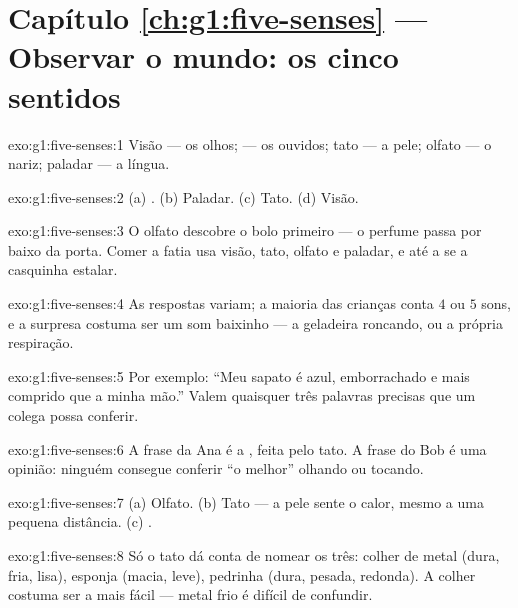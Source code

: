 \section*{Capítulo \ref{ch:g1:five-senses} --- Observar o mundo: os cinco sentidos}

\begin{solution}{exo:g1:five-senses:1}
Visão --- os olhos;  --- os ouvidos; tato --- a pele; olfato
--- o nariz; paladar --- a língua.
\end{solution}

\begin{solution}{exo:g1:five-senses:2}
(a) . (b) Paladar. (c) Tato. (d) Visão.
\end{solution}

\begin{solution}{exo:g1:five-senses:3}
O olfato descobre o bolo primeiro --- o perfume passa por baixo da
porta. Comer a fatia usa visão, tato, olfato e paladar, e até a
 se a casquinha estalar.
\end{solution}

\begin{solution}{exo:g1:five-senses:4}
As respostas variam; a maioria das crianças conta $4$ ou $5$ sons, e
a surpresa costuma ser um som baixinho --- a geladeira roncando, ou a
própria respiração.
\end{solution}

\begin{solution}{exo:g1:five-senses:5}
Por exemplo: ``Meu sapato é azul, emborrachado e mais comprido que a
minha mão.'' Valem quaisquer três palavras precisas que um colega
possa conferir.
\end{solution}

\begin{solution}{exo:g1:five-senses:6}
A frase da Ana é a , feita pelo tato. A frase do Bob é
uma opinião: ninguém consegue conferir ``o melhor'' olhando ou
tocando.
\end{solution}

\begin{solution}{exo:g1:five-senses:7}
(a) Olfato. (b) Tato --- a pele sente o calor, mesmo a uma pequena
distância. (c) .
\end{solution}

\begin{solution}{exo:g1:five-senses:8}
Só o tato dá conta de nomear os três: colher de metal (dura, fria,
lisa), esponja (macia, leve), pedrinha (dura, pesada, redonda). A
colher costuma ser a mais fácil --- metal frio é difícil de
confundir.
\end{solution}

